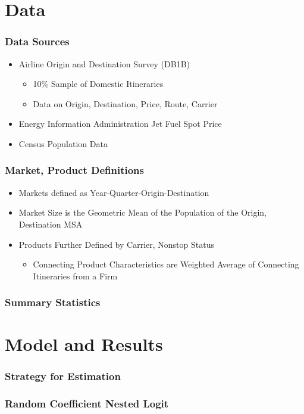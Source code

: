 \documentclass[xcolor=dvipsnames]{beamer}
\begin{document}
	\section{Data}
	\begin{frame}
		\frametitle{Data Sources}
		\begin{itemize}
			\item Airline Origin and Destination Survey (DB1B)
			\begin{itemize}
				\item 10\% Sample of Domestic Itineraries 
				\item Data on Origin, Destination, Price, Route, Carrier
			\end{itemize}
			\item Energy Information Administration Jet Fuel Spot Price
			\item Census Population Data
		\end{itemize}
	\end{frame}
	
	\begin{frame}
		\frametitle{Market, Product Definitions}
		\begin{itemize}
			\item Markets defined as Year-Quarter-Origin-Destination 
			\item Market Size is the Geometric Mean of the Population of the Origin, Destination MSA
			\item Products Further Defined by Carrier, Nonstop Status
			\begin{itemize}
				\item Connecting Product Characteristics are Weighted Average of Connecting Itineraries from a Firm
			\end{itemize}
		\end{itemize}
	\end{frame}

	
	\begin{frame}
		\frametitle{Summary Statistics}
		
	\end{frame}
	
	\section{Model and Results}
	\begin{frame}
		\frametitle{Strategy for Estimation}
	\end{frame}
	
	\begin{frame}
		\frametitle{Random Coefficient Nested Logit}
	\end{frame}
	
\end{document}
